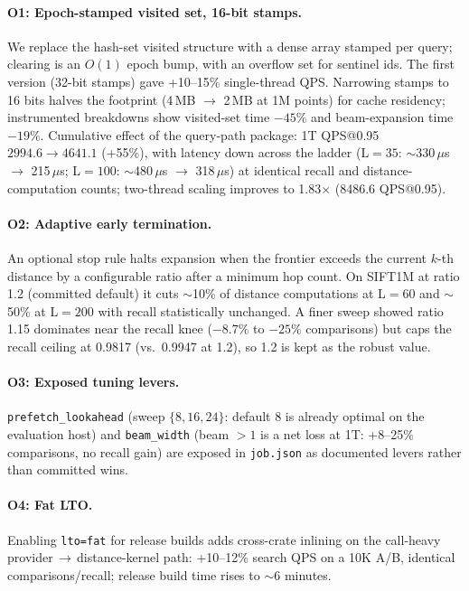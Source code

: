 \documentclass[11pt]{article}
\begin{document}
\paragraph{O1: Epoch-stamped visited set, 16-bit stamps.}
We replace the hash-set visited structure with a dense array stamped per
query; clearing is an $O(1)$ epoch bump, with an overflow set for sentinel
ids. The first version (32-bit stamps) gave +10--15\% single-thread QPS.
Narrowing stamps to 16 bits halves the footprint (4\,MB $\to$ 2\,MB at 1M
points) for cache residency; instrumented breakdowns show visited-set time
$-45\%$ and beam-expansion time $-19\%$. Cumulative effect of the query-path
package: 1T QPS@0.95 $2994.6 \to 4641.1$ (+55\%), with latency down across
the ladder (L$=35$: $\sim$330\,$\mu$s $\to$ 215\,$\mu$s; L$=100$:
$\sim$480\,$\mu$s $\to$ 318\,$\mu$s) at identical recall and distance-computation
counts; two-thread scaling improves to 1.83$\times$ (8486.6 QPS@0.95).

\paragraph{O2: Adaptive early termination.}
An optional stop rule halts expansion when the frontier exceeds the current
$k$-th distance by a configurable ratio after a minimum hop count. On SIFT1M
at ratio 1.2 (committed default) it cuts $\sim$10\% of distance computations
at L$=60$ and $\sim$50\% at L$=200$ with recall statistically unchanged.
A finer sweep showed ratio 1.15 dominates near the recall knee
($-8.7\%$ to $-25\%$ comparisons) but caps the recall ceiling at 0.9817
(vs.\ 0.9947 at 1.2), so 1.2 is kept as the robust value.

\paragraph{O3: Exposed tuning levers.}
\texttt{prefetch\_lookahead} (sweep $\{8,16,24\}$: default 8 is already
optimal on the evaluation host) and \texttt{beam\_width} (beam $>1$ is a net
loss at 1T: +8--25\% comparisons, no recall gain) are exposed in
\texttt{job.json} as documented levers rather than committed wins.

\paragraph{O4: Fat LTO.}
Enabling \texttt{lto=fat} for release builds adds cross-crate inlining on the
call-heavy provider\,$\to$\,distance-kernel path: +10--12\% search QPS on a
10K A/B, identical comparisons/recall; release build time rises to
$\sim$6 minutes.
\end{document}
